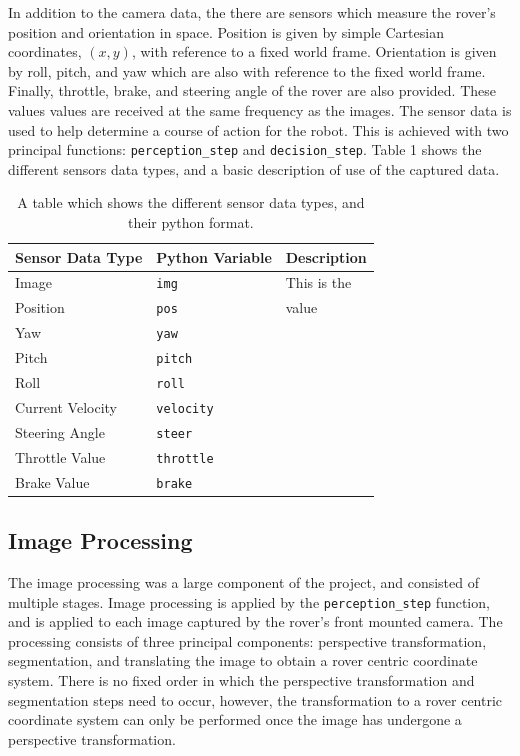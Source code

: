 \documentclass[a4paper]{article}
\begin{document}
In addition to the camera data, the there are sensors which measure the rover's position and orientation in space. Position is given by simple Cartesian coordinates, $(x, y)$, with reference to a fixed world frame. Orientation is given by roll, pitch, and yaw which are also with reference to the fixed world frame. Finally, throttle, brake, and steering angle of the rover are also provided. These values values are received at the same frequency as the images. The sensor data is used to help determine a course of action for the robot. This is achieved with two principal functions: \verb|perception_step| and \verb|decision_step|. Table 1 shows the different sensors data types, and a basic description of use of the captured data. 

\begin{table}
\caption{A table which shows the different sensor data types, and their python format.}
\begin{tabular}{lll}
\toprule
\textbf{Sensor Data Type} & \textbf{Python Variable} & \textbf{Description}\\
\midrule
Image & \verb|img| & This is the \\
Position & \verb|pos| & value\\
Yaw & \verb|yaw| & \\
Pitch & \verb|pitch| & \\
Roll & \verb|roll| & \\
Current Velocity & \verb|velocity| & \\
Steering Angle & \verb|steer| & \\
Throttle Value & \verb|throttle| & \\
Brake Value & \verb|brake| & 
\bottomrule
\end{tabular}
\end{table}

\subsection{Image Processing}
The image processing was a large component of the project, and consisted of multiple stages. Image processing is applied by the \verb|perception_step| function, and is applied to each image captured by the rover's front mounted camera. The processing consists of three principal components: perspective transformation, segmentation, and translating the image to obtain a rover centric coordinate system. There is no fixed order in which the perspective transformation and segmentation steps need to occur, however, the transformation to a rover centric coordinate system can only be performed once the image has undergone a perspective transformation.
\end{document}
